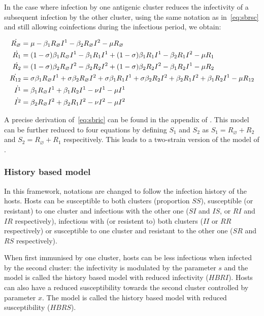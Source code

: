 In the case where infection by one antigenic cluster reduces the
infectivity of a subsequent infection by the other cluster, using the
same notation as in~\eqref{eq:sbrsc} and still allowing coinfections
during the infectious period, we obtain:


\begin{align}
\dot{R_\varnothing} & = \mu -\beta_1 R_\varnothing I^1 -\beta_2 R_\varnothing I^2 -\mu R_\varnothing \label{eq:sbric}\\
\dot{R_1} & = (1-\sigma) \beta_1 R_\varnothing I^1 - \beta_1 R_1 I^1  + (1- \sigma) \beta_1 R_1 I^1 - \beta_2 R_1 I^2  -\mu R_1 \notag \\
\dot{R_2} & = (1-\sigma) \beta_2 R_\varnothing I^2 - \beta_2 R_2 I^2 + (1 -\sigma) \beta_2 R_2 I^2 - \beta_1 R_2 I^1  -\mu R_2 \notag \\
\dot{R_{12}} & = \sigma \beta_1 R_\varnothing I^1 + \sigma \beta_2 R_\varnothing I^2 + \sigma \beta_1 R_1 I^1 + \sigma \beta_2 R_2 I^2 + \beta_2 R_1 I^2  + \beta_1 R_2 I^1 -\mu R_{12} \notag \\
\dot{I^1} & = \beta_1 R_\varnothing I^1 + \beta_1 R_2 I^1 -\nu I^1  -\mu I^1 \notag \\
\dot{I^2} & = \beta_2 R_\varnothing I^2 + \beta_2 R_1 I^2 -\nu I^2  -\mu I^2 \notag 
\end{align}

A precise derivation of~\eqref{eq:sbric} can be found in the appendix
of \citet{Kryazhimskiy2007}. This model can be further reduced to four
equations by defining $S_1$ and $S_2$ as $S_1 = R_\varnothing + R_2$
and $S_2= R_\varnothing + R_1$ respecitively. This leads to a
two-strain version of the model of \citet{Gog2002}.

\subsubsection{History based model}

In this framework, notations are changed to follow the infection
history of the hosts. Hosts can be susceptible to both clusters
(proportion $SS$), susceptible (or resistant) to one cluster and
infectious with the other one ($SI$ and $IS$, or $RI$ and $IR$
respectively), infectious with (or resistent to) both clusters ($II$
or $RR$ respectively) or susceptible to one cluster and resistant to
the other one ($SR$ and $RS$ respectively).

When first immunised by one cluster, hosts can be less infectious when
infected by the second cluster: the infectivity is modulated by the
parameter $s$ and the model is called the history based model with
reduced infectivity ($HBRI$). Hosts can also have a reduced
susceptibility towards the second cluster controlled by parameter $x$.
The model is called the history based model with reduced
susceptibility ($HBRS$).
 
